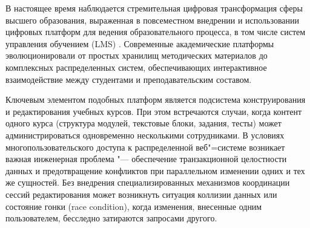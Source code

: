 \documentclass[coursework]{SCWorks}
\begin{document}

\date{2026}

\maketitle

\secNumbering

\tableofcontents




\intro

В настоящее время наблюдается стремительная цифровая трансформация сферы высшего образования, выраженная в повсеместном внедрении и использовании цифровых платформ для ведения образовательного процесса, в том числе систем управления обучением (LMS) \cite{digital_economy}. Современные академические платформы эволюционировали от простых хранилищ методических материалов до комплексных распределенных систем, обеспечивающих интерактивное взаимодействие между студентами и преподавательским составом.

Ключевым элементом подобных платформ является подсистема конструирования и редактирования учебных курсов. При этом встречаются случаи, когда контент одного курса (структура модулей, текстовые блоки, задания, тесты) может администрироваться одновременно несколькими сотрудниками. В условиях многопользовательского доступа к распределенной веб"=системе возникает важная инженерная проблема "--- обеспечение транзакционной целостности данных и предотвращение конфликтов при параллельном изменении одних и тех же сущностей. Без внедрения специализированных механизмов координации сессий редактирования может возникнуть ситуация коллизии данных или состояние гонки (race condition), когда изменения, внесенные одним пользователем, бесследно затираются запросами другого.
\end{document}
